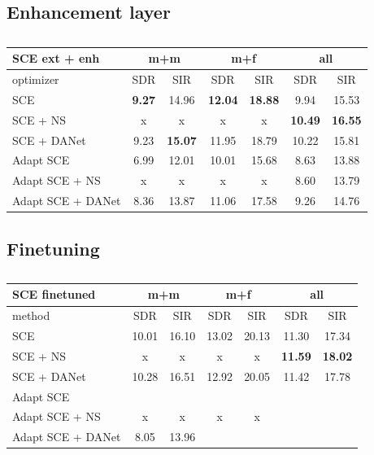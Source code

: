\documentclass[master, tikz, final,11pt, dvipdfmx]{iscs-thesis}
\begin{document}
\subsection{Enhancement layer}
\label{enh}

\lipsum[1]

\begin{table}[h!]
\begin{tabular}{l|c|c|c|c|c|c}
SCE ext + enh & \multicolumn{2}{c|}{m+m} & \multicolumn{2}{c|}{m+f} & \multicolumn{2}{c}{all} \\ 
\hline 
optimizer & SDR & SIR & SDR & SIR & SDR & SIR \\ 
\hline
SCE  & \textbf{9.27} & 14.96 & \textbf{12.04} & \textbf{18.88} & 9.94 & 15.53 \\ 
SCE + NS & x & x & x & x & \textbf{10.49} & \textbf{16.55} \\ 
SCE + DANet  & 9.23 & \textbf{15.07} & 11.95 & 18.79 & 10.22 & 15.81 \\ 
\hline 
\hline 
Adapt SCE  & 6.99 & 12.01 & 10.01 & 15.68 & 8.63 & 13.88 \\ 
Adapt SCE + NS & x & x & x & x & 8.60 & 13.79 \\ 
Adapt SCE + DANet  & 8.36 & 13.87 & 11.06 & 17.58 & 9.26 & 14.76 \\ 

\end{tabular}
\captionsetup{justification=centering}
\caption{}
\label{table:SCE400enh}
\end{table}

\subsection{Finetuning}
\label{finetuning}

\lipsum[1]

\begin{table}[h]
\begin{tabular}{l|c|c|c|c|c|c}
SCE finetuned & \multicolumn{2}{c|}{m+m} & \multicolumn{2}{c|}{m+f} & \multicolumn{2}{c}{all} \\ 
\hline 
method & SDR & SIR & SDR & SIR & SDR & SIR \\ 
\hline
SCE  & 10.01 & 16.10 & 13.02 & 20.13 & 11.30 & 17.34 \\ 
SCE + NS & x & x & x & x & \textbf{11.59} & \textbf{18.02} \\ 
SCE + DANet  & 10.28 & 16.51 & 12.92 & 20.05 & 11.42 & 17.78 \\ 
\hline 
\hline 
Adapt SCE  &  & &  & & &  \\ 
Adapt SCE + NS & x & x & x & x & & \\ 
Adapt SCE + DANet  & 8.05 & 13.96 & & & & \\ 

\end{tabular}
\captionsetup{justification=centering}
\caption{}
\label{table:SCE400enh}
\end{table}
\end{document}
